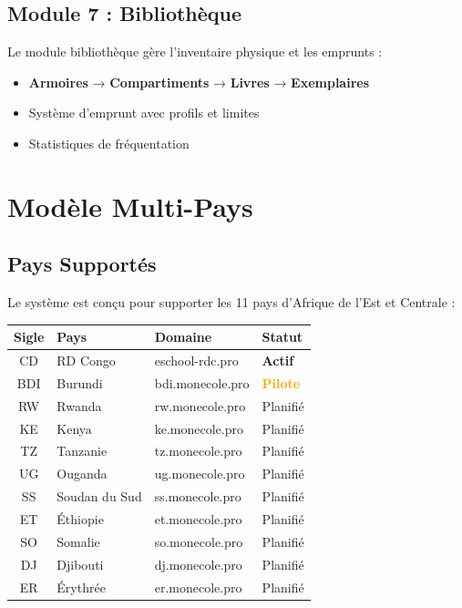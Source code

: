 \documentclass[12pt,a4paper,oneside]{report}
\begin{document}
\section{Module 7 : Bibliothèque}

Le module bibliothèque gère l'inventaire physique et les emprunts :
\begin{itemize}
  \item \textbf{Armoires} → \textbf{Compartiments} → \textbf{Livres} → \textbf{Exemplaires}
  \item Système d'emprunt avec profils et limites
  \item Statistiques de fréquentation
\end{itemize}


\chapter{Modèle Multi-Pays}

\section{Pays Supportés}

Le système est conçu pour supporter les 11 pays d'Afrique de l'Est et Centrale :

\begin{center}
\begin{tabular}{c l l l}
\toprule
\textbf{Sigle} & \textbf{Pays} & \textbf{Domaine} & \textbf{Statut} \\
\midrule
CD & RD Congo & eschool-rdc.pro & \textcolor{green!60!black}{\textbf{Actif}} \\
BDI & Burundi & bdi.monecole.pro & \textcolor{orange}{\textbf{Pilote}} \\
RW & Rwanda & rw.monecole.pro & Planifié \\
KE & Kenya & ke.monecole.pro & Planifié \\
TZ & Tanzanie & tz.monecole.pro & Planifié \\
UG & Ouganda & ug.monecole.pro & Planifié \\
SS & Soudan du Sud & ss.monecole.pro & Planifié \\
ET & Éthiopie & et.monecole.pro & Planifié \\
SO & Somalie & so.monecole.pro & Planifié \\
DJ & Djibouti & dj.monecole.pro & Planifié \\
ER & Érythrée & er.monecole.pro & Planifié \\
\bottomrule
\end{tabular}
\end{center}
\end{document}
